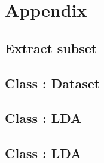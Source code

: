 \documentclass[12 pt,twopage]{article}
\begin{document}
%
%
%
%




\newpage




\newpage
\section{Appendix}
\subsection{Extract subset} \label{extract}


\subsection{Class : Dataset} \label{class:dataset}


\subsection{Class : LDA} \label{class:lda}


\subsection{Class : LDA} \label{code:generativeModel}

\end{document}
